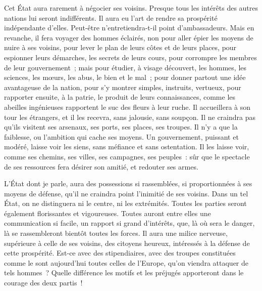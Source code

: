 \documentclass[french,twoside]{book} %
\begin{document}
Cet État aura rarement à négocier ses voisins. Presque tous les intérêts des autres nations lui seront indifférents. Il aura eu l’art de rendre sa prospérité indépendante d’elles. Peut-être n’entretiendra-t-il point d’ambassadeurs. Mais en revanche, il fera voyager des hommes éclairés, non pour aller épier les moyens de nuire à ses voisins, pour lever le plan de leurs côtes et de leurs places, pour espionner leurs démarches, les secrets de leurs cours, pour corrompre les membres de leur gouvernement ; mais pour étudier, à visage découvert, les hommes, les sciences, les mœurs, les abus, le bien et le mal ; pour donner partout une idée avantageuse de la nation, pour s’y montrer simples, instruits, vertueux, pour rapporter ensuite, à la patrie, le produit de leurs connaissances, comme les abeilles ingénieuses rapportent le suc des fleurs à leur ruche. Il accueillera à son tour les étrangers, et il les recevra, sans jalousie, sans soupçon. Il ne craindra pas qu’ils visitent ses arsenaux, ses ports, ses places, ses troupes. Il n’y a que la faiblesse, ou l’ambition qui cache ses moyens. Un gouvernement, puissant et modéré, laisse voir les siens, sans méfiance et sans ostentation. Il les laisse voir, comme ses chemins, ses villes, ses campagnes, ses peuples : sûr que le spectacle de ses ressources fera désirer son amitié, et redouter ses armes.\par
L’État dont je parle, aura des possessions si rassemblées, si proportionnées à ses moyens de défense, qu’il ne craindra point l’inimitié de ses voisins. Dans un tel État, on ne distinguera ni le centre, ni les extrémités. Toutes les parties seront également florissantes et vigoureuses. Toutes auront entre elles une communication si facile, un rapport si grand d’intérêts, que, là où sera le danger, là se rassembleront bientôt toutes les forces. Il aura une milice nerveuse, supérieure à celle de ses voisins, des citoyens heureux, intéressés à la défense de cette prospérité. Est-ce avec des stipendiaires, avec des troupes constituées comme le sont aujourd’hui toutes celles de l’Europe, qu’on viendra attaquer de tels hommes ? Quelle différence les motifs et les préjugés apporteront dans le courage des deux partis !\par
\end{document}
